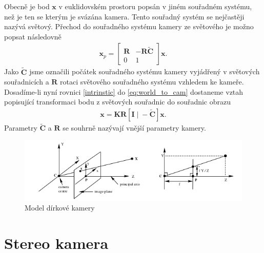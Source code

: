\documentclass[twoside]{ctuthesis}
\newcommand{\tl}[1]{$\mathbf{#1}$}
\begin{document}
Obecně je bod $\mathbf{x}$ v euklidovském prostoru popsán v jiném souřadném systému, než je ten se kterým je svázána kamera. Tento souřadný systém se nejčastěji nazývá světový. Přechod do souřadného systému kamery ze světového je možno popsat následovně 
\begin{align} 
    \mathbf{x}_p = \begin{bmatrix} \mathbf{R} & -\mathbf{R\tilde C} \\ 0 & 1 \end{bmatrix}
    \mathbf{x}.
    \label{eq:world_to_cam}
\end{align}
Jako $\tilde{\mathbf{C}}$ jsme označili počátek souřadného systému kamery vyjádřený v světových souřadnicích a \tl{R} rotaci světového souřadného systému vzhledem ke kameře. Dosadíme-li nyní rovnici \ref{intrinstic} do \ref{eq:world_to_cam} dostaneme vztah popisující transformaci bodu z světových souřadnic do souřadnic obrazu
\begin{align}
    \mathbf{x} = \mathbf{KR}[\mathbf{I} \; | \; - \mathbf{\tilde C} ]\mathbf{x}.
    \label{eq:world_to_img}
\end{align}
Parametry $\mathbf{\tilde C}$ a \tl{R} se souhrně nazývají vnější parametry kamery. 
\begin{figure}
    \centering
    \includegraphics[width = 0.8\linewidth]{pictures/dirkovymodel_nakres.png}
    \caption{Model dírkové kamery}
    \label{pinhole}
\end{figure}

\section{Stereo kamera}
\end{document}
